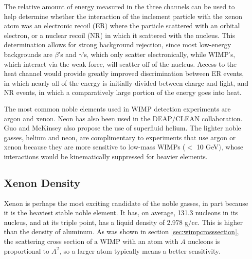 The relative amount of energy measured in the three channels can be used to help determine whether the interaction of the inclement particle with the xenon atom was an electronic recoil (ER) where the particle scattered with an orbital electron, or a nuclear recoil (NR) in which it scattered with the nucleus. This determination allows for strong background rejection, since most low-energy backgrounds are $\beta$'s and $\gamma$'s, which only scatter electronically, while WIMP's, which interact via the weak force, will scatter off of the nucleus. Access to the heat channel would provide greatly improved discrimination between ER events, in which nearly all of the energy is initially divided between charge and light, and NR events, in which a comparatively large portion of the energy goes into heat.

The most common noble elements used in WIMP detection experiments are argon and xenon. Neon has also been used in the DEAP/CLEAN collaboration\cite{clean1,clean2}. Guo and McKinsey also propose the use of superfluid helium\cite{he_dm}. The lighter noble gasses, helium and neon, are complimentary to experiments that use argon or xenon because they are more sensitive to low-mass WIMPs ($<$ 10 GeV), whose interactions would be kinematically suppressed for heavier elements.

\subsection{Xenon Density}
Xenon is perhaps the most exciting candidate of the noble gasses, in part because it is the heaviest stable noble element. It has, on average, 131.3 nucleons in its nucleus, and at its triple point, has a liquid density of 2.978 g/cc. This is higher than the density of aluminum. As was shown in section \ref{sec:wimpcrosssection}, the scattering cross section of a WIMP with an atom with $A$ nucleons is proportional to $A^2$, so a larger atom typically means a better sensitivity. 

